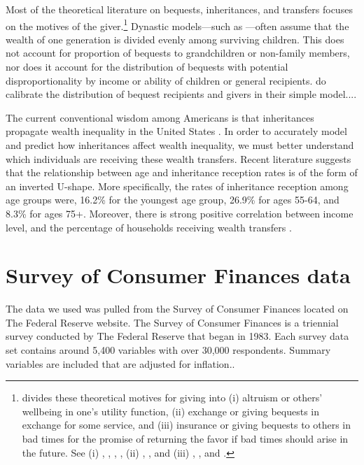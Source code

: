 \documentclass[letterpaper,12pt]{article}
\theoremstyle{definition}
\begin{document}
\begin{spacing}{1.5}
  Most of the theoretical literature on bequests, inheritances, and transfers focuses on the motives of the giver.\footnote{\citet{Wolff:2015} divides these theoretical motives for giving into (i) altruism or others' wellbeing in one's utility function, (ii) exchange or giving bequests in exchange for some service, and (iii) insurance or giving bequests to others in bad times for the promise of returning the favor if bad times should arise in the future. See (i) \citet{Barro:1974}, \citet{Becker:1974}, \citet{BeckerTomes:1979}, \citet{Tomes:1981}, (ii) \citet{BernheimEtAl:1985}, \citet{Cox:1987}, and (iii) \citet{Cox:1990}, \citet{CoxJappelli:1990}, and \citet{Kochar:1997}.} Dynastic models---such as \citet{GokhaleEtAl:2001}---often assume that the wealth of one generation is divided evenly among surviving children. This does not account for proportion of bequests to grandchildren or non-family members, nor does it account for the distribution of bequests with potential disproportionality by income or ability of children or general recipients. \citet{PikettySaez:2013} do calibrate the distribution of bequest recipients and givers in their simple model....

  The current conventional wisdom among Americans is that inheritances propagate wealth inequality in the United States \citet{Wolff:2015}. In order to accurately model and predict how inheritances affect wealth inequality, we must better understand which individuals are receiving these wealth transfers. Recent literature suggests that the relationship between age and inheritance reception rates is of the form of an inverted U-shape. More specifically, the rates of inheritance reception among age groups were, 16.2\% for the youngest age group, 26.9\% for ages 55-64, and 8.3\% for ages 75+. Moreover, there is strong positive correlation between income level, and the percentage of households receiving wealth transfers \citet{Wolff:2015}.


\section{Survey of Consumer Finances data}\label{SecSCFdata}

  The data we used was pulled from the Survey of Consumer Finances located on The Federal Reserve website. The Survey of Consumer Finances is a triennial survey conducted by The Federal Reserve that began in 1983. Each survey data set contains around 5,400 variables with over 30,000 respondents. Summary variables are included that are adjusted for inflation.\citet{FED}.


\end{spacing}
\end{document}
